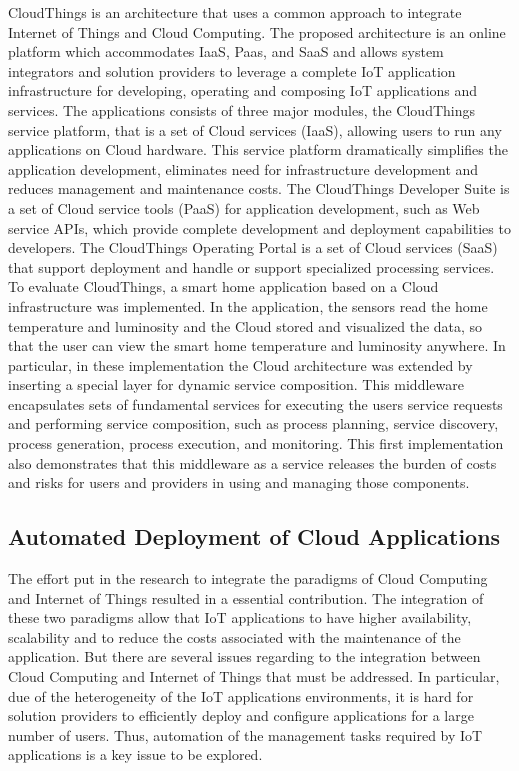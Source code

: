 CloudThings \cite{zhou2013cloudthings} is an architecture that uses a common approach
to integrate Internet of Things and Cloud Computing. The proposed architecture is an online
platform which accommodates IaaS, Paas, and SaaS and allows system integrators and solution
providers to leverage a complete IoT application infrastructure for developing, operating and
composing IoT applications and services. The applications consists of three major modules,
the CloudThings service platform, that is a set of Cloud services (IaaS), allowing users to
run any applications on Cloud hardware. This service platform dramatically simplifies the
application development, eliminates need for infrastructure development and reduces management
and maintenance costs. The CloudThings Developer Suite is a set of Cloud service tools (PaaS) for
application development, such as Web service APIs, which provide complete development and
deployment capabilities to developers. The CloudThings Operating Portal is a set of Cloud
services (SaaS) that support deployment and handle or support specialized processing services.
To evaluate CloudThings, a smart home application based on a Cloud infrastructure was implemented.
In the application, the sensors read the home temperature and luminosity and the Cloud
stored and visualized the data, so that the user can view the smart home temperature and luminosity
anywhere. In particular, in these implementation the Cloud architecture was extended by inserting
a special layer for dynamic service composition. This middleware encapsulates sets of fundamental
services for executing the users service requests and performing service composition, such as process planning,
service discovery, process generation, process execution, and monitoring. This first implementation
also demonstrates that this middleware as a service releases the burden of costs and risks for users and
providers in using and managing those components.\\
\subsection{Automated Deployment of Cloud Applications}
\label{sub:Automated Deployment of IoT Applications}
The effort put in the research to integrate the paradigms of Cloud Computing and Internet
of Things resulted in a essential contribution. The integration of these two paradigms allow
that IoT applications to have higher availability, scalability and to reduce the costs associated
with the maintenance of the application. But there are several issues regarding to the integration
between Cloud Computing and Internet of Things that must be addressed. In particular, due of the
heterogeneity of the IoT applications environments, it is hard for solution providers to efficiently
deploy and configure applications for a large number of users. Thus, automation of the management
tasks required by IoT applications is a key issue to be explored.\\

